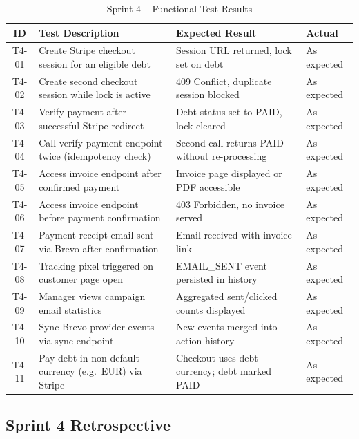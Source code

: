 \documentclass[12pt,a4paper]{report}
\newcommand{\reporttablesetup}{%
  \small%
  \setlength{\tabcolsep}{5pt}%
  \renewcommand{\arraystretch}{1.22}%
  \arrayrulecolor{framegray}%
}
\begin{document}
\begin{table}[!htbp]
  \centering
  \footnotesize\reporttablesetup
  \begin{tabularx}{\textwidth}{|c|Y|p{3.85cm}|p{1.8cm}|}
    \hline
    \textbf{ID} & \textbf{Test Description} & \textbf{Expected Result}
      & \textbf{Actual} \\
    \hline
    T4-01 & Create Stripe checkout session for an eligible debt &
      Session URL returned, lock set on debt & As expected \\
    \hline
    T4-02 & Create second checkout session while lock is active &
      409 Conflict, duplicate session blocked & As expected \\
    \hline
    T4-03 & Verify payment after successful Stripe redirect &
      Debt status set to PAID, lock cleared & As expected \\
    \hline
    T4-04 & Call verify-payment endpoint twice (idempotency check) &
      Second call returns PAID without re-processing & As expected \\
    \hline
    T4-05 & Access invoice endpoint after confirmed payment &
      Invoice page displayed or PDF accessible & As expected \\
    \hline
    T4-06 & Access invoice endpoint before payment confirmation &
      403 Forbidden, no invoice served & As expected \\
    \hline
    T4-07 & Payment receipt email sent via Brevo after confirmation &
      Email received with invoice link & As expected \\
    \hline
    T4-08 & Tracking pixel triggered on customer page open &
      EMAIL\_SENT event persisted in history & As expected \\
    \hline
    T4-09 & Manager views campaign email statistics &
      Aggregated sent/clicked counts displayed & As expected \\
    \hline
    T4-10 & Sync Brevo provider events via sync endpoint &
      New events merged into action history & As expected \\
    \hline
    T4-11 & Pay debt in non-default currency (e.g.\ EUR) via Stripe &
      Checkout uses debt currency; debt marked PAID & As expected \\
    \hline
  \end{tabularx}
  \caption{Sprint 4 -- Functional Test Results}
  \label{tab:test-s4}
\end{table}

\subsection{Sprint 4 Retrospective}
\end{document}
